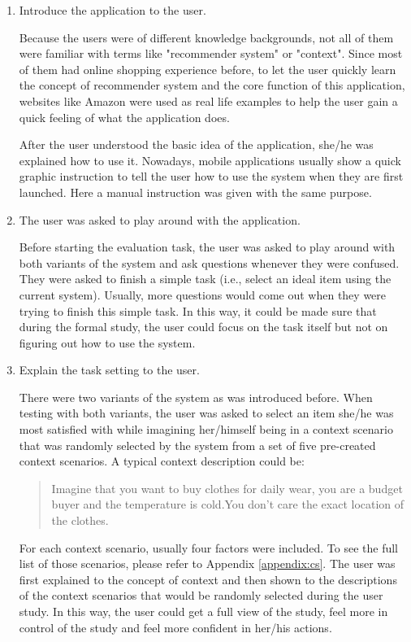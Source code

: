 \begin{enumerate}
\item{Introduce the application to the user.}

Because the users were of different knowledge backgrounds, not all of them were familiar with terms like "recommender system" or "context". Since most of them had online shopping experience before, to let the user quickly learn the concept of recommender system and the core function of this application, websites like Amazon were used as real life examples to help the user gain a quick feeling of what the application does.

After the user understood the basic idea of the application, she/he was explained how to use it. Nowadays, mobile applications usually show a quick graphic instruction to tell the user how to use the system when they are first launched. Here a manual instruction was given with the same purpose.

\item{The user was asked to play around with the application.}

Before starting the evaluation task, the user was asked to play around with both variants of the system and ask questions whenever they were confused. They were asked to finish a simple task (i.e., select an ideal item using the current system). Usually, more questions would come out when they were trying to finish this simple task. In this way, it could be made sure that during the formal study, the user could focus on the task itself but not on figuring out how to use the system.

\item{Explain the task setting to the user.}

There were two variants of the system as was introduced before. When testing with both variants, the user was asked to select an item she/he was most satisfied with while imagining her/himself being in a context scenario that was randomly selected by the system from a set of five pre-created context scenarios. A typical context description could be:

\blockquote{Imagine that you want to buy clothes for daily wear, you are a budget buyer and the temperature is cold.You don't care the exact location of the clothes.}

For each context scenario, usually four factors were included. To see the full list of those scenarios, please refer to Appendix \ref{appendix:cs}. The user was first explained to the concept of context and then shown to the descriptions of the context scenarios that would be randomly selected during the user study. In this way, the user could get a full view of the study, feel more in control of the study and feel more confident in her/his actions.


\end{enumerate}
